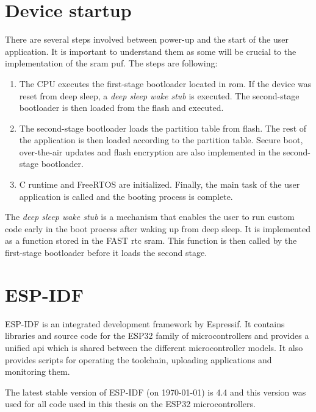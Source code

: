 \section{Device startup}\label{sec:device_startup}

There are several steps involved between power-up and the start of the user application. It is important to understand them as some will be crucial to the implementation of the \gls{sram} \gls{puf}. The steps are following:

\begin{enumerate}
    \item The CPU executes the first-stage bootloader located in \gls{rom}. If the device was reset from deep sleep, a \emph{deep sleep wake stub} is executed. The second-stage bootloader is then loaded from the flash and executed.
    \item The second-stage bootloader loads the partition table from flash. The rest of the application is then loaded according to the partition table. Secure boot, over-the-air updates and flash encryption are also implemented in the second-stage bootloader.
    \item C runtime and FreeRTOS are initialized. Finally, the main task of the user application is called and the booting process is complete.
\end{enumerate}

The \emph{deep sleep wake stub} is a mechanism that enables the user to run custom code early in the boot process after waking up from deep sleep. It is implemented as a function stored in the FAST \gls{rtc} \gls{sram}. This function is then called by the first-stage bootloader before it loads the second stage.~\cite{espidf2022}

\section{ESP-IDF}

ESP-IDF is an integrated development framework by Espressif. It contains libraries and source code for the ESP32 family of microcontrollers and provides a unified \gls{api} which is shared between the different microcontroller models. It also provides scripts for operating the toolchain, uploading applications and monitoring them.~\cite{espidf2022}

The latest stable version of ESP-IDF (on \today) is 4.4 and this version was used for all code used in this thesis on the ESP32 microcontrollers.

